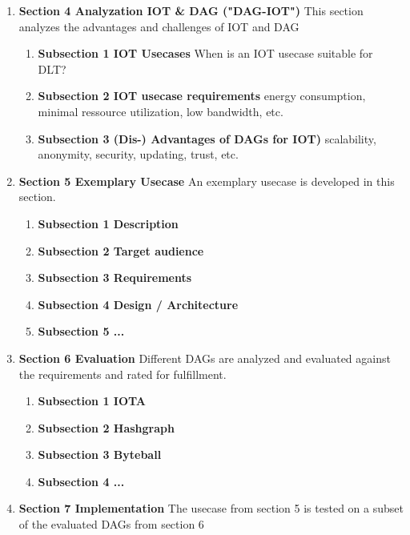 \documentclass[
    ngerman,american
    ]{scrartcl}
\begin{document}
\begin{enumerate}
            \item \textbf{Section 4 Analyzation IOT \& DAG ("DAG-IOT")} This section analyzes the advantages and challenges of IOT and DAG
                    \begin{enumerate}
                        \item \textbf{Subsection 1 IOT Usecases} When is an IOT usecase suitable for DLT?
                        \item \textbf{Subsection 2 IOT usecase requirements} energy consumption, minimal ressource utilization, low bandwidth, etc.
                        \item \textbf{Subsection 3 (Dis-) Advantages of DAGs for IOT)} scalability, anonymity, security, updating, trust, etc.
                    \end{enumerate}
            \item \textbf{Section 5 Exemplary Usecase} An exemplary usecase is developed in this section.
                    \begin{enumerate}
                        \item \textbf{Subsection 1 Description}
                        \item \textbf{Subsection 2 Target audience}
                        \item \textbf{Subsection 3 Requirements}
                        \item \textbf{Subsection 4 Design / Architecture}
                        \item \textbf{Subsection 5 ...}
                    \end{enumerate}
            \item \textbf{Section 6 Evaluation} Different DAGs are analyzed and evaluated against the requirements and rated for fulfillment.
                    \begin{enumerate}
                        \item \textbf{Subsection 1 IOTA}
                        \item \textbf{Subsection 2 Hashgraph}
                        \item \textbf{Subsection 3 Byteball}
                        \item \textbf{Subsection 4 ...}
                    \end{enumerate}
            \item \textbf{Section 7 Implementation} The usecase from section 5 is tested on a subset of the evaluated DAGs from section 6
                    \begin{enumerate}

\end{enumerate}
\end{enumerate}
\end{document}
